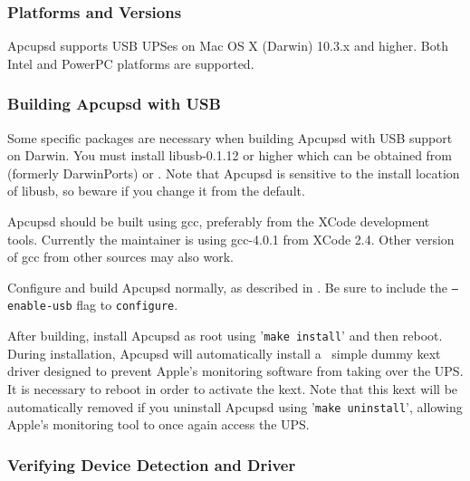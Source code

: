 \subsubsection*{Platforms and Versions}

Apcupsd supports USB UPSes on Mac OS X (Darwin) 10.3.x and higher. Both Intel
and PowerPC platforms are supported.

\subsubsection*{Building Apcupsd with USB}

Some specific packages are necessary when building Apcupsd with USB support
on Darwin. You must install libusb-0.1.12 or higher which can be obtained
from  (formerly DarwinPorts) or 
. Note that Apcupsd is
sensitive to the install location of libusb, so beware if you change it
from the default.

Apcupsd should be built using gcc, preferably from the XCode development
tools. Currently the maintainer is using gcc-4.0.1 from XCode 2.4. Other
version of gcc from other sources may also work.

Configure and build Apcupsd normally, as described in
.
Be sure to include the \texttt{{---}enable-usb} flag to \texttt{configure}.

After building, install Apcupsd as root using '\texttt{make install}' and
then reboot. During installation, Apcupsd will automatically install a \
simple dummy kext driver designed to prevent Apple's monitoring software
from taking over the UPS. It is necessary to reboot in order to activate
the kext. Note that this kext will be automatically removed if you
uninstall Apcupsd using '\texttt{make uninstall}', allowing Apple's
monitoring tool to once again access the UPS.

\subsubsection*{Verifying Device Detection and Driver}

